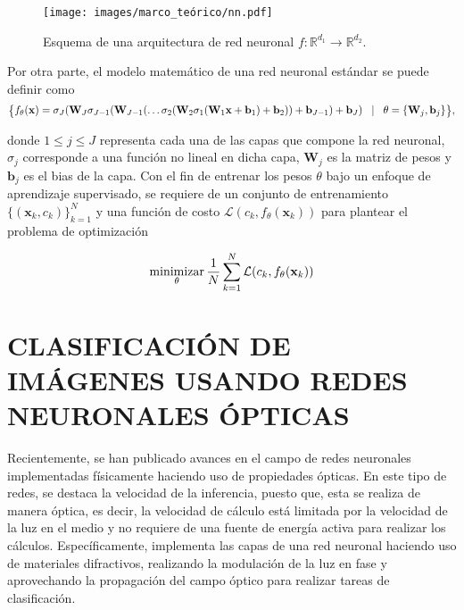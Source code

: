 \begin{figure}[H]
    \centering
    \caption{\hspace{2mm}Esquema de una arquitectura de red neuronal $f: \mathbb{R}^{d_1} \rightarrow \mathbb{R}^{d_2}$.}
    \texttt{[image: images/marco\_teórico/nn.pdf]}
    \label{fig:nn}
\end{figure}

Por otra parte, el modelo matemático de una red neuronal estándar se puede definir como
\begin{equation}
    \footnotesize 
    \big\{f_\theta(\mathbf{x}) = \sigma_{J}(\mathbf{W}_{J}\sigma_{J-1}(\mathbf{W}_{J-1} (\dots \sigma_2(\mathbf{W}_2\sigma_1(\mathbf{W}_1\mathbf{x} + \mathbf{b}_1) + \mathbf{b}_2))  + \mathbf{b}_{J-1})  + \mathbf{b}_J) \quad \vert \quad\theta = \{\mathbf{W}_{j}, \mathbf{b}_{j}\}  \big\},
    \label{eq:red_neuronal}
\end{equation}

donde $1 \leq j \leq J$ representa cada una de las capas que compone la red neuronal, $\sigma_j$ corresponde a una función no lineal en dicha capa, $\mathbf{W}_j$ es la matriz de pesos y $\mathbf{b}_j$ es el bias de la capa. Con el fin de entrenar los pesos $\theta$ bajo un enfoque de aprendizaje supervisado, se requiere de un conjunto de entrenamiento $\{(\mathbf{x}_k, c_k) \}_{k=1}^{N}$ y una función de costo $\mathcal{L}( c_k,  f_\theta(\mathbf{x}_k))$ para plantear el problema de optimización 

\begin{equation}
    \operatorname*{minimizar}_\theta \frac{1}{N}\sum_{k=1}^{N} \mathcal{L}( {c}_k,  f_\theta(\mathbf{x}_k))
    \label{eq:optimización_nn}
\end{equation}
\section{CLASIFICACIÓN DE IMÁGENES USANDO REDES NEURONALES ÓPTICAS}


Recientemente, se han publicado avances en el campo de redes neuronales implementadas físicamente haciendo uso de propiedades ópticas. En este tipo de redes, se destaca la velocidad de la inferencia, puesto que, esta se realiza de manera óptica, es decir, la velocidad de cálculo está limitada por la velocidad de la luz en el medio y no requiere de una fuente de energía activa para realizar los cálculos. Específicamente,  implementa las capas de una red neuronal haciendo uso de materiales difractivos, realizando la modulación de la luz en fase y aprovechando la propagación del campo óptico para realizar tareas de clasificación.


